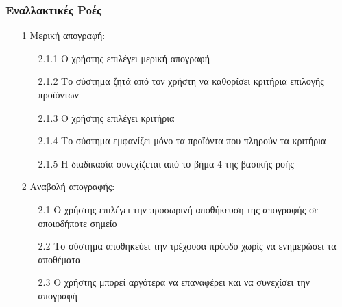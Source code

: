 \documentclass[12pt,a4paper,twoside]{book}
\begin{document}
\subsubsection{Εναλλακτικές Ροές}
\begin{enumerate}
  \item[1 ] Μερική απογραφή:
        \begin{enumerate}
          \item[2.1.1 ] Ο χρήστης επιλέγει μερική απογραφή
          \item[2.1.2 ] Το σύστημα ζητά από τον χρήστη να καθορίσει κριτήρια επιλογής προϊόντων
          \item[2.1.3 ] Ο χρήστης επιλέγει κριτήρια %
          \item[2.1.4 ] Το σύστημα εμφανίζει μόνο τα προϊόντα που πληρούν τα κριτήρια
          \item[2.1.5 ] Η διαδικασία συνεχίζεται από το βήμα 4 της βασικής ροής %
        \end{enumerate}
  \item[2 ] Αναβολή απογραφής:
        \begin{enumerate}
          \item[2.1 ] Ο χρήστης επιλέγει την προσωρινή αποθήκευση της απογραφής σε οποιοδήποτε σημείο %
          \item[2.2 ] Το σύστημα αποθηκεύει την τρέχουσα πρόοδο χωρίς να ενημερώσει τα αποθέματα %
          \item[2.3 ] Ο χρήστης μπορεί αργότερα να επαναφέρει και να συνεχίσει την απογραφή
        \end{enumerate}

\end{enumerate}
\end{document}
